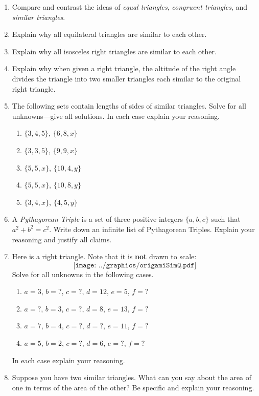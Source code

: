 \begin{problems}
\begin{enumerate}
\item Compare and contrast the ideas of \textit{equal triangles},
  \textit{congruent triangles}, and \textit{similar triangles}.
\item Explain why all equilateral triangles are similar to each other.
\item Explain why all isosceles right triangles are similar to each other. 
\item Explain why when given a right triangle, the altitude of the
  right angle divides the triangle into two smaller triangles each
  similar to the original right triangle.
\item The following sets contain lengths of sides of similar
  triangles. Solve for all unknowns---give all solutions. In each case
  explain your reasoning.
\begin{enumerate}
\item $\{3,4,5\}$, $\{6,8,x\}$
\item $\{3,3,5\}$, $\{9,9,x\}$
\item $\{5,5,x\}$, $\{10,4,y\}$
\item $\{5,5,x\}$, $\{10,8,y\}$
\item $\{3,4,x\}$, $\{4,5,y\}$ 
\end{enumerate}
\item A \textit{Pythagorean Triple} is a set
  of three positive integers $\{a,b,c\}$ such that $a^2 + b^2 =
  c^2$. Write down an infinite list of Pythagorean Triples. Explain
  your reasoning and justify all claims.
\item Here is a right triangle. Note that it is \textbf{not} drawn to
  scale:
\[
\texttt{[image: ../graphics/origamiSimQ.pdf]}
\]
Solve for all unknowns in the following cases.
\begin{enumerate}
\item $a = 3$, $b = ?$, $c = ?$, $d = 12$, $e = 5$, $f = ?$
\item $a = ?$, $b = 3$, $c = ?$, $d =8$, $e = 13$, $f = ?$
\item $a = 7$, $b = 4$, $c = ?$, $d =?$, $e = 11$, $f = ?$
\item $a = 5$, $b = 2$, $c = ?$, $d =6$, $e = ?$, $f = ?$
\end{enumerate}
In each case explain your reasoning.

\item Suppose you have two similar triangles. What can you say about
  the area of one in terms of the area of the other? Be specific and
  explain your reasoning.


\end{enumerate}
\end{problems}
